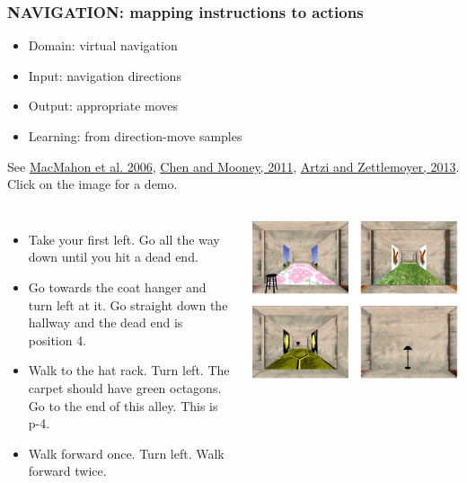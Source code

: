\documentclass[ignorenonframetext]{beamer}
\begin{document}
\begin{frame}\frametitle{NAVIGATION: mapping instructions to actions}
\begin{itemize}
\item Domain: virtual navigation
\item Input: navigation directions
\item Output: appropriate moves
\item Learning: from direction-move samples
\end{itemize}
See
\href{http://www.aaai.org/Papers/AAAI/2006/AAAI06-232.pdf}{MacMahon et al. 2006}, 
\href{http://www.cs.utexas.edu/users/ml/papers/chen.aaai11.pdf}{Chen and Mooney, 2011},
\href{http://aclweb.org/anthology/Q/Q13/Q13-1005.pdf}{Artzi and Zettlemoyer, 2013}.
Click on the image for a demo.
\begin{columns}[c]
\begin{itemize}\scriptsize
\item Take your first left.  Go all the way down until you hit a dead end.
\item Go towards the coat hanger and turn left at it.  Go straight down the hallway and the dead end is position 4.
\item Walk to the hat rack.  Turn left.  The carpet should have green octagons.  Go to the end of this alley. This is p-4.
\item Walk forward once.  Turn left.   Walk forward twice.
\end{itemize}
\href{http://www.cs.utexas.edu/users/ml/clamp/navigation}{
\includegraphics[width=\textwidth]{images/macmahon-navigation.png}}
\end{columns}
\end{frame}
\end{document}

